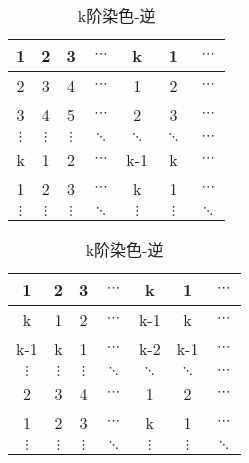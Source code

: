 \begin{table}[h]
	\caption{k阶染色}
	\label{fig:k-order-staining}
	\begin{subtable}{.5\linewidth}
		\centering
		\caption{k阶正染色}
		\begin{tabular}{|c|c|c|c|c|c|c|}
			\hline
			1        & 2        & 3        & $\cdots$ & k        & 1        & $\cdots$ \\
			\hline
			2        & 3        & 4        & $\cdots$ & 1        & 2        & $\cdots$ \\
			\hline
			3        & 4        & 5        & $\cdots$ & 2        & 3        & $\cdots$ \\
			\hline
			$\vdots$ & $\vdots$ & $\vdots$ & $\ddots$ & $\ddots$ & $\ddots$ & $\cdots$ \\
			\hline
			k        & 1        & 2        & $\cdots$ & k-1      & k        & $\cdots$ \\
			\hline
			1        & 2        & 3        & $\cdots$ & k        & 1        & $\cdots$ \\
			\hline
			$\vdots$ & $\vdots$ & $\vdots$ & $\ddots$ & $\vdots$ & $\vdots$ & $\ddots$ \\
			\hline
		\end{tabular}
		\label{fig:k-order-staining-1}
	\end{subtable}%
	\begin{subtable}{.5\linewidth}
		\centering
		\caption{k阶染色-逆}
		\begin{tabular}{|c|c|c|c|c|c|c|}
			\hline
			1        & 2        & 3        & $\cdots$ & k        & 1        & $\cdots$ \\
			\hline
			k        & 1        & 2        & $\cdots$ & k-1      & k        & $\cdots$ \\
			\hline
			k-1      & k        & 1        & $\cdots$ & k-2      & k-1      & $\cdots$ \\
			\hline
			$\vdots$ & $\vdots$ & $\vdots$ & $\ddots$ & $\ddots$ & $\ddots$ & $\cdots$ \\
			\hline
			2        & 3        & 4        & $\cdots$ & 1        & 2        & $\cdots$ \\
			\hline
			1        & 2        & 3        & $\cdots$ & k        & 1        & $\cdots$ \\
			\hline
			$\vdots$ & $\vdots$ & $\vdots$ & $\ddots$ & $\vdots$ & $\vdots$ & $\ddots$ \\
			\hline
		\end{tabular}
		\label{fig:k-order-staining-2}
	\end{subtable}
\end{table}


